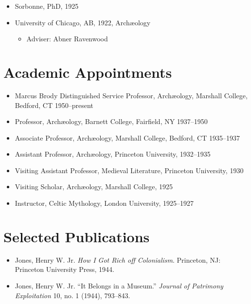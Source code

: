 \documentclass[%
    11pt,
  oneside
  ]{memoir}
\begin{document}
\begin{adjustwidth*}{9em}{0em}
\begin{itemize}
\tightlist
\item
  Sorbonne, PhD, 1925
\item
  University of Chicago, AB, 1922, Archæology

  \begin{itemize}
  \tightlist
  \item
    Adviser: Abner Ravenwood
  \end{itemize}
\end{itemize}

\hypertarget{academic-appointments}{%
\section{Academic Appointments}\label{academic-appointments}}

\begin{itemize}
\tightlist
\item
  Marcus Brody Distinguished Service Professor, Archæology, Marshall
  College, Bedford, CT 1950--present
\item
  Professor, Archæology, Barnett College, Fairfield, NY 1937--1950
\item
  Associate Professor, Archæology, Marshall College, Bedford, CT
  1935--1937
\item
  Assistant Professor, Archæology, Princeton University, 1932--1935
\item
  Visiting Assistant Professor, Medieval Literature, Princeton
  University, 1930
\item
  Visiting Scholar, Archæology, Marshall College, 1925
\item
  Instructor, Celtic Mythology, London University, 1925--1927
\end{itemize}

\hypertarget{selected-publications}{%
\section{Selected Publications}\label{selected-publications}}

\begin{itemize}
\tightlist
\item
  Jones, Henry W. Jr. \emph{How I Got Rich off Colonialism}. Princeton,
  NJ: Princeton University Press, 1944.
\item
  Jones, Henry W. Jr. ``It Belongs in a Museum.'' \emph{Journal of
  Patrimony Exploitation} 10, no. 1 (1944), 793--843.
\end{itemize}


\end{adjustwidth*}
\end{document}

